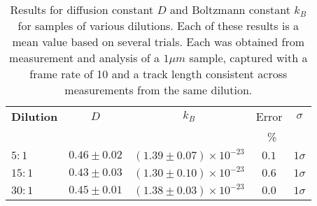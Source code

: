 \begin{table}[H]
\centering
\label{tab:density}
\begin{tabular}{||l|c|c|c|c||}
 \hline
 \bf Dilution & \textbf{$D$} & \bf $k_B$ & Error & $\sigma$\\
    \bf  &   &  & \SI{}{\percent} &\\
 \hline
 \bf $5:1$ & $0.46 \pm 0.02$ & $(1.39 \pm 0.07) \times10^{-23}$ & $0.1$ & $1\sigma$\\
 \bf $15:1$ & $0.43 \pm 0.03$ & $(1.30 \pm 0.10) \times10^{-23}$ & $0.6$ & $1\sigma$\\
 \bf $30:1$ & $0.45 \pm 0.01$ & $(1.38 \pm 0.03) \times10^{-23}$ & $0.0$ & $1\sigma$\\
 \hline
\end{tabular}
\caption{Results for diffusion constant $D$ and Boltzmann constant $k_B$ for samples of various dilutions. Each of these results is a mean value based on several trials. Each was obtained from measurement and analysis of a $1 \si{\mu m}$ sample, captured with a frame rate of 10 and a track length consistent across measurements from the same dilution.}
\end{table}